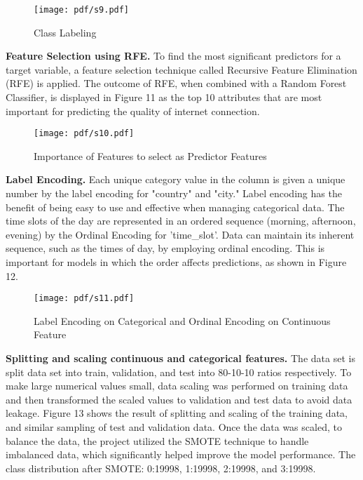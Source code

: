 \begin{figure}[ht!]
  \raggedright
  \texttt{[image: pdf/s9.pdf]}
  \vspace{-10pt}
  \caption{Class Labeling\textbf{ }}
\end{figure}

\textbf{Feature Selection using RFE.}
To find the most significant predictors for a target variable, a feature selection technique called Recursive Feature Elimination (RFE) is applied. The outcome of RFE, when combined with a Random Forest Classifier, is displayed in Figure 11  as the top 10 attributes that are most important for predicting the quality of internet connection.

\begin{figure}[ht!]
  \raggedright
  \texttt{[image: pdf/s10.pdf]}
  \vspace{-10pt}
  \caption{\textbf{ }Importance of Features to select as Predictor Features }
\end{figure}

\textbf{Label Encoding.}
Each unique category value in the column is given a unique number by the label encoding for "country" and "city." Label encoding has the benefit of being easy to use and effective when managing categorical data. The time slots of the day are represented in an ordered sequence (morning, afternoon, evening) by the Ordinal Encoding for 'time\_slot'. Data can maintain its inherent sequence, such as the times of day, by employing ordinal encoding. This is important for models in which the order affects predictions, as shown in Figure 12.

\begin{figure}[ht!]
  \raggedright
  \texttt{[image: pdf/s11.pdf]}
  \vspace{-10pt}
  \caption{\textbf{ }Label Encoding on Categorical and Ordinal Encoding on Continuous Feature}
\end{figure}

\textbf{Splitting and scaling continuous and categorical features.}
The data set is split data set into train, validation, and test into 80-10-10 ratios respectively. To make large numerical values small, data scaling was performed on training data and then transformed the scaled values to validation and test data to avoid data leakage. Figure 13 shows the result of splitting and scaling of the training data, and similar sampling of test and validation data. Once the data was scaled, to balance the data, the project utilized the SMOTE technique to handle imbalanced data, which significantly helped improve the model performance.  The class distribution after SMOTE: 0:19998, 1:19998, 2:19998, and 3:19998.

